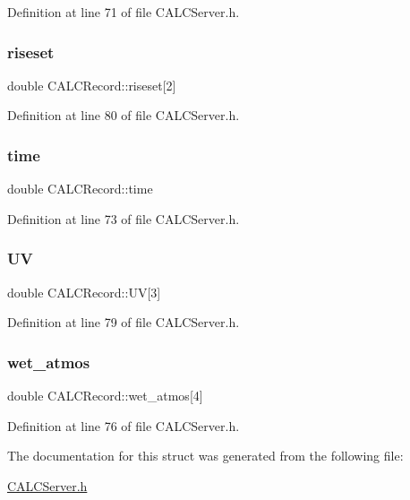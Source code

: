 Definition at line 71 of file C\+A\+L\+C\+Server.\+h.

\mbox{\label{struct_c_a_l_c_record_a8d637728f0f4139ebbab32666c7ecee0}} 
\subsubsection{\texorpdfstring{riseset}{riseset}}
{\footnotesize\ttfamily double C\+A\+L\+C\+Record\+::riseset\mbox{[}2\mbox{]}}



Definition at line 80 of file C\+A\+L\+C\+Server.\+h.

\mbox{\label{struct_c_a_l_c_record_a0248175f80e111ae370307f9c2b87b05}} 
\subsubsection{\texorpdfstring{time}{time}}
{\footnotesize\ttfamily double C\+A\+L\+C\+Record\+::time}



Definition at line 73 of file C\+A\+L\+C\+Server.\+h.

\mbox{\label{struct_c_a_l_c_record_ab0b23df760eaf81ad5449e70ac646d9b}} 
\subsubsection{\texorpdfstring{UV}{UV}}
{\footnotesize\ttfamily double C\+A\+L\+C\+Record\+::\+UV\mbox{[}3\mbox{]}}



Definition at line 79 of file C\+A\+L\+C\+Server.\+h.

\mbox{\label{struct_c_a_l_c_record_aed3cc6fcc95a72cf0222398f5a7745c6}} 
\subsubsection{\texorpdfstring{wet\+\_\+atmos}{wet\_atmos}}
{\footnotesize\ttfamily double C\+A\+L\+C\+Record\+::wet\+\_\+atmos\mbox{[}4\mbox{]}}



Definition at line 76 of file C\+A\+L\+C\+Server.\+h.



The documentation for this struct was generated from the following file\+:\begin{DoxyCompactItemize}
\item 
\hyperlink{_c_a_l_c_server_8h}{C\+A\+L\+C\+Server.\+h}\end{DoxyCompactItemize}

